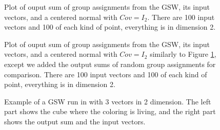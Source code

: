 \documentclass[12pt]{article}
\begin{document}
\begin{figure}[h]

\caption{Plot of ouput sum of group assignments from the GSW, its input vectors, and a centered normal with $Cov=I_2$. There are 100 input vectors and 100 of each kind of point, everything is in dimension 2.}
\label{4types_3}
\end{figure}
\begin{figure}[h]

\caption{Plot of ouput sum of group assignments from the GSW, its input vectors, and a centered normal with $Cov=I_2$ similarly to Figure \ref{4types_3}, except we added the output sums of random group assignments for comparison. There are 100 input vectors and 100 of each kind of point, everything is in dimension 2.}
\end{figure}
\begin{figure}
\newpage
{}
\caption{Example of a GSW run in with 3 vectors in 2 dimension. The left part shows the cube where the coloring is living, and the right part shows the output sum and the input vectors.}
\label{3d_example}
\end{figure}
\end{document}
